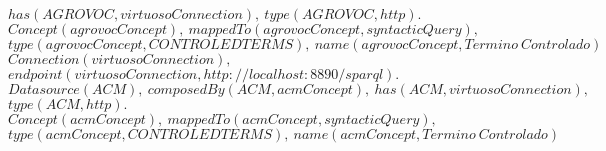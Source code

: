 \begin{minipage}{\textwidth}
$has(AGROVOC, virtuosoConnection), \ type(AGROVOC,http).$ \\
$Concept(agrovocConcept), \ mappedTo(agrovocConcept, syntacticQuery), $\\
$type(agrovocConcept, CONTROLEDTERMS), \ name(agrovocConcept, Termino \ Controlado)$\\
$Connection(virtuosoConnection),$
$endpoint(virtuosoConnection, http{:}//localhost{:}8890/sparql).$\\
$Datasource(ACM), \ composedBy(ACM, acmConcept), \ has(ACM, virtuosoConnection),$\\
$type(ACM,http).$ \\
$Concept(acmConcept), \ mappedTo(acmConcept,syntacticQuery),$\\
$type(acmConcept,CONTROLEDTERMS),  \ name(acmConcept, Termino \ Controlado)$\\
\end{minipage}

